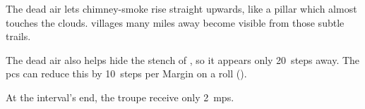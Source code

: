 \begin{boxtext}
  The dead air lets chimney-smoke rise straight upwards, like a pillar which
  almost touches the clouds.  \Glspl{village} many miles away become visible
  from those subtle trails.
\end{boxtext}

The dead air also helps hide the stench of , so it appears only 20~\glspl{step} away.
The \glspl{pc} can reduce this by 10~\glspl{step} per Margin on a  roll (\tn[10]).

\basilisk

At the \gls{interval}'s end, the troupe receive only 2~\glspl{mp}.

